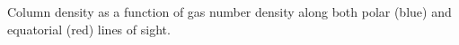 \label{fig:ncol_fit}
Column density as a function of gas number density along both polar (blue) and equatorial (red) lines of sight.